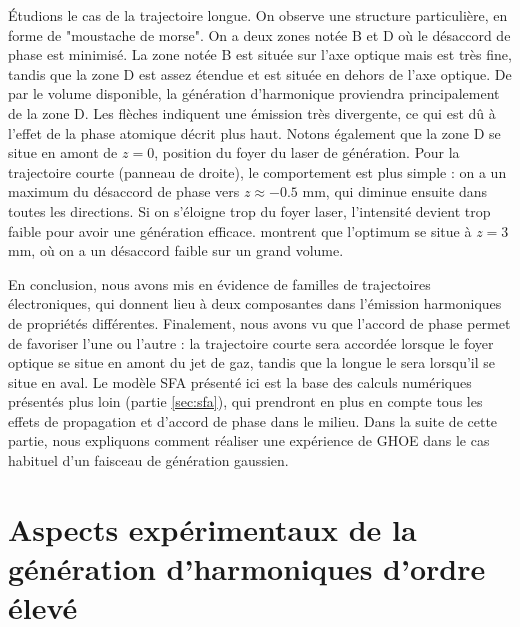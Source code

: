 \'Etudions le cas de la trajectoire longue. On observe une structure particulière, en forme de "moustache de morse". On a deux zones notée B et D où le désaccord de phase est minimisé. La zone notée B est située sur l'axe optique mais est très fine, tandis que la zone D est assez étendue et est située en dehors de l'axe optique. De par le volume disponible, la génération d'harmonique proviendra principalement de la zone D. Les flèches indiquent une émission très divergente, ce qui est dû à l'effet de la phase atomique décrit plus haut. Notons également que la zone D se situe en amont de $z=0$, position du foyer du laser de génération. Pour la trajectoire courte (panneau de droite), le comportement est plus simple : on a un maximum du désaccord de phase vers $z\approx-0.5$ mm, qui diminue ensuite dans toutes les directions. Si on s'éloigne trop du foyer laser, l'intensité devient trop faible pour avoir une génération efficace.  montrent que l'optimum se situe à $z=3$ mm, où on a un désaccord faible sur un grand volume. 

En conclusion, nous avons mis en évidence de familles de trajectoires électroniques, qui donnent lieu à deux composantes dans l'émission harmoniques de propriétés différentes. Finalement, nous avons vu que l'accord de phase permet de favoriser l'une ou l'autre : la trajectoire courte sera accordée lorsque le foyer optique se situe en amont du jet de gaz, tandis que la longue le sera lorsqu'il se situe en aval. Le modèle SFA présenté ici est la base des calculs numériques présentés plus loin (partie \ref{sec:sfa}), qui prendront en plus en compte tous les effets de propagation et d'accord de phase dans le milieu. Dans la suite de cette partie, nous expliquons comment réaliser une expérience de GHOE dans le cas habituel d'un faisceau de génération gaussien.

\chapter{Aspects expérimentaux de la génération d'harmoniques d'ordre élevé}
\label{Sec:HHG_G}
